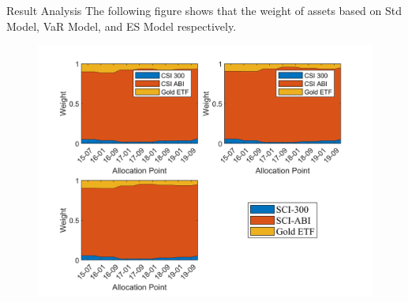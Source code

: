 \documentclass{beamer}
\begin{document}
\begin{frame}{Result Analysis}
The following figure shows that the weight of assets based on Std Model, VaR Model, and ES Model respectively.
\begin{figure}[H]
    \centering
    \includegraphics[scale=0.5]{Figure/FIG5-Allocation_Weight.png}
    \label{Fig5}
\end{figure}
\end{frame}
\end{document}
